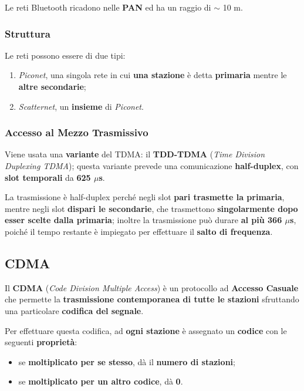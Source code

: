 \documentclass[a4paper]{article}
\begin{document}
		Le reti Bluetooth ricadono nelle \textbf{PAN} ed ha un raggio di $ \sim $ 10 m.
		
		
		\subsubsection{Struttura}
		
			Le reti possono essere di due tipi:
			\begin{enumerate}
				\item \emph{Piconet}, una singola rete in cui \textbf{una stazione} è detta \textbf{primaria} mentre le \textbf{altre secondarie};
				\item \emph{Scatternet}, un \textbf{insieme} di \emph{Piconet}.
			\end{enumerate}
			
		
		\subsubsection{Accesso al Mezzo Trasmissivo}
			
			Viene usata una \textbf{variante} del TDMA: il \textbf{TDD-TDMA} (\emph{Time Division Duplexing TDMA}); questa variante prevede una comunicazione \textbf{half-duplex}, con \textbf{slot temporali} da \textbf{625 $ \mu $s}.
			
			La trasmissione è half-duplex perché negli slot \textbf{pari trasmette la primaria}, mentre negli slot \textbf{dispari le secondarie}, che trasmettono \textbf{singolarmente dopo esser scelte dalla primaria}; inoltre la trasmissione può durare \textbf{al più 366 $ \mu $s}, poiché il tempo restante è impiegato per effettuare il \textbf{salto di frequenza}.
	
	
	\subsection{CDMA}
	\label{sec:CDMA}
	
		Il \textbf{CDMA} (\emph{Code Division Multiple Access}) è un protocollo ad \textbf{Accesso Casuale} che permette la \textbf{trasmissione contemporanea di tutte le stazioni} sfruttando una particolare \textbf{codifica del segnale}.
		
		Per effettuare questa codifica, ad \textbf{ogni stazione} è assegnato un \textbf{codice} con le seguenti \textbf{proprietà}:
		\begin{itemize}
			\item se \textbf{moltiplicato per se stesso}, dà il \textbf{numero di stazioni};
			\item se \textbf{moltiplicato per un altro codice}, dà \textbf{0}.
		\end{itemize}
	
\end{document}
